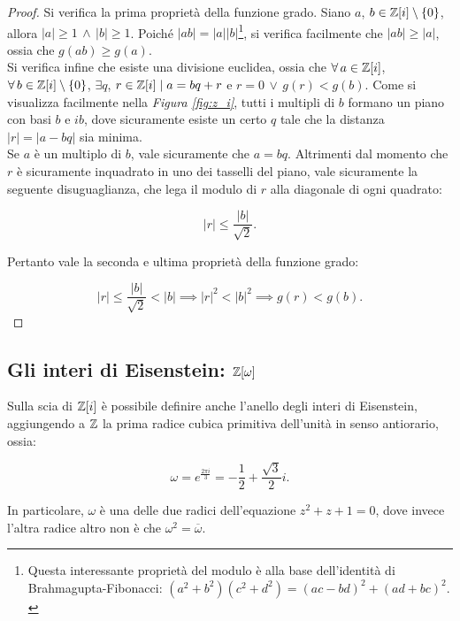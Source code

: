 \begin{proof}
    Si verifica la prima proprietà della funzione grado. Siano $a$, $b \in \mathbb Z[i] \setminus \{0\}$,
    allora $\left|a\right| \geq 1 \,\land\, \left|b\right| \geq 1$. Poiché
    $\left|ab\right| = \left|a\right|\left|b\right|$\footnote{Questa interessante proprietà del modulo è alla base dell'identità di Brahmagupta-Fibonacci: $(a^2 + b^2)(c^2 + d^2) = (ac-bd)^2 + (ad+bc)^2.$}, si verifica facilmente che
    $\left|ab\right| \geq \left|a\right|$, ossia che $g(ab) \geq g(a)$. \\

    Si verifica infine che esiste una divisione euclidea, ossia che
    $\forall a \in \ZZ[i]$, $\forall b \in \ZZ[i] \setminus \{0\}$, $\exists q$, $r \in \mathbb Z[i] \mid a = bq + r$ e $r=0 \,\lor\, g(r) < g(b)$.
    Come si visualizza facilmente nella \textit{Figura \ref{fig:z_i}},
    tutti i multipli di $b$ formano un piano con basi $b$ e $ib$, dove
    sicuramente esiste un certo $q$ tale che la distanza $\left|r\right| = \left|a-bq\right|$ sia minima. \\

    Se $a$ è un multiplo di $b$, vale sicuramente che $a = bq$. Altrimenti dal momento che $r$ è sicuramente inquadrato in uno dei tasselli del piano, vale
    sicuramente la seguente disuguaglianza, che lega il modulo di $r$ alla diagonale di
    ogni quadrato:

    \[\left|r\right| \leq \frac{\left|b\right|}{\sqrt{2}}.\]

    Pertanto vale la seconda e ultima proprietà della funzione grado:

    \[\left|r\right| \leq \frac{\left|b\right|}{\sqrt{2}} < \left|b\right| \implies \left|r\right|^2 < \left|b\right|^2 \implies g(r) < g(b).\]
\end{proof}

\subsection{Gli interi di Eisenstein: \texorpdfstring{$\mathbb Z[\omega]$}{Z[ω]}}

Sulla scia di $\mathbb Z[i]$ è possibile definire anche l'anello degli
interi di Eisenstein, aggiungendo a $\mathbb Z$ la prima radice cubica
primitiva dell'unità in senso antiorario, ossia:

\[\omega = e^{\frac{2\pi i}{3}} = -\frac{1}{2} + \frac{\sqrt{3}}{2}i.\]

In particolare, $\omega$ è una delle due radici dell'equazione
$z^2 + z + 1 = 0$, dove invece l'altra radice altro non è che
$\omega^2 = \overline{\omega}$.


